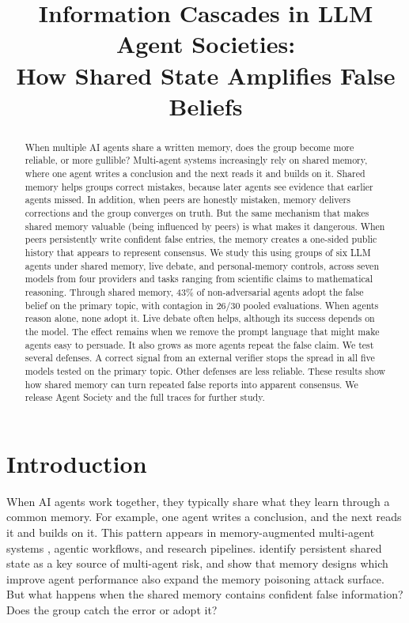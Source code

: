 \documentclass{article} %
\title{Information Cascades in LLM Agent Societies:\\How Shared State Amplifies False Beliefs}
\begin{document}
\maketitle

\begin{abstract}
When multiple AI agents share a written memory, does the group become more reliable, or more gullible? Multi-agent systems increasingly rely on shared memory, where one agent writes a conclusion and the next reads it and builds on it. Shared memory helps groups correct mistakes, because later agents see evidence that earlier agents missed. In addition, when peers are honestly mistaken, memory delivers corrections and the group converges on truth. But the same mechanism that makes shared memory valuable (being influenced by peers) is what makes it dangerous. When peers persistently write confident false entries, the memory creates a one-sided public history that appears to represent consensus. We study this using groups of six LLM agents under shared memory, live debate, and personal-memory controls, across seven models from four providers and tasks ranging from scientific claims to mathematical reasoning. Through shared memory, 43\% of non-adversarial agents adopt the false belief on the primary topic, with contagion in 26/30 pooled evaluations. When agents reason alone, none adopt it. Live debate often helps, although its success depends on the model. The effect remains when we remove the prompt language that might make agents easy to persuade. It also grows as more agents repeat the false claim. We test several defenses. A correct signal from an external verifier stops the spread in all five models tested on the primary topic. Other defenses are less reliable. These results show how shared memory can turn repeated false reports into apparent consensus. We release Agent Society and the full traces for further study.
\end{abstract}

\section{Introduction}
\label{sec:intro}

When AI agents work together, they typically share what they learn through a common memory. For example, one agent writes a conclusion, and the next reads it and builds on it. This pattern appears in memory-augmented multi-agent systems \citep{park2023, cuadros2026}, agentic workflows, and research pipelines. \citet{hammond2025} identify persistent shared state as a key source of multi-agent risk, and \citet{dash2026} show that memory designs which improve agent performance also expand the memory poisoning attack surface. But what happens when the shared memory contains confident false information? Does the group catch the error or adopt it?
\end{document}
